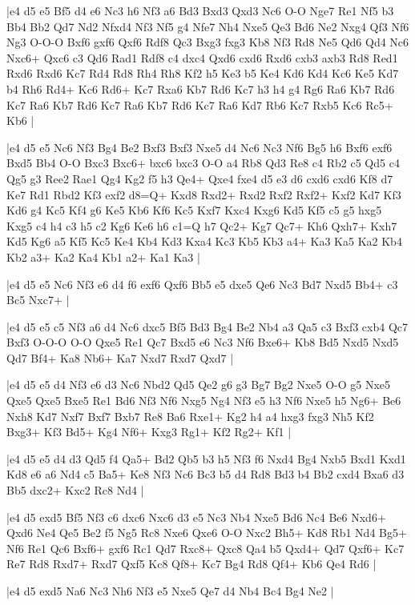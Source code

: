 \whitename{}
\blackname{}
\makegametitle
|e4 d5 e5 Bf5 d4 e6 Nc3 h6 Nf3 a6 Bd3 Bxd3 Qxd3 Nc6 O-O Nge7 Re1 Nf5 b3 Bb4 Bb2 Qd7 Nd2 Nfxd4 Nf3 Nf5 g4 Nfe7 Nh4 Nxe5 Qe3 Bd6 Ne2 Nxg4 Qf3 Nf6 Ng3 O-O-O Bxf6 gxf6 Qxf6 Rdf8 Qc3 Bxg3 fxg3 Kb8 Nf3 Rd8 Ne5 Qd6 Qd4 Nc6 Nxc6+ Qxc6 c3 Qd6 Rad1 Rdf8 c4 dxc4 Qxd6 cxd6 Rxd6 cxb3 axb3 Rd8 Red1 Rxd6 Rxd6 Kc7 Rd4 Rd8 Rh4 Rh8 Kf2 h5 Ke3 b5 Ke4 Kd6 Kd4 Kc6 Ke5 Kd7 b4 Rh6 Rd4+ Kc6 Rd6+ Kc7 Rxa6 Kb7 Rd6 Kc7 h3 h4 g4 Rg6 Ra6 Kb7 Rd6 Kc7 Ra6 Kb7 Rd6 Kc7 Ra6 Kb7 Rd6 Kc7 Ra6 Kd7 Rb6 Kc7 Rxb5 Kc6 Rc5+ Kb6  |

\whitename{}
\blackname{}
\makegametitle
|e4 d5 e5 Nc6 Nf3 Bg4 Be2 Bxf3 Bxf3 Nxe5 d4 Nc6 Nc3 Nf6 Bg5 h6 Bxf6 exf6 Bxd5 Bb4 O-O Bxc3 Bxc6+ bxc6 bxc3 O-O a4 Rb8 Qd3 Re8 c4 Rb2 c5 Qd5 c4 Qg5 g3 Ree2 Rae1 Qg4 Kg2 f5 h3 Qe4+ Qxe4 fxe4 d5 e3 d6 cxd6 cxd6 Kf8 d7 Ke7 Rd1 Rbd2 Kf3 exf2 d8=Q+ Kxd8 Rxd2+ Rxd2 Rxf2 Rxf2+ Kxf2 Kd7 Kf3 Kd6 g4 Kc5 Kf4 g6 Ke5 Kb6 Kf6 Kc5 Kxf7 Kxc4 Kxg6 Kd5 Kf5 c5 g5 hxg5 Kxg5 c4 h4 c3 h5 c2 Kg6 Ke6 h6 c1=Q h7 Qc2+ Kg7 Qc7+ Kh6 Qxh7+ Kxh7 Kd5 Kg6 a5 Kf5 Kc5 Ke4 Kb4 Kd3 Kxa4 Kc3 Kb5 Kb3 a4+ Ka3 Ka5 Ka2 Kb4 Kb2 a3+ Ka2 Ka4 Kb1 a2+ Ka1 Ka3  |

\whitename{}
\blackname{}
\makegametitle
|e4 d5 e5 Nc6 Nf3 e6 d4 f6 exf6 Qxf6 Bb5 e5 dxe5 Qe6 Nc3 Bd7 Nxd5 Bb4+ c3 Bc5 Nxc7+  |

\whitename{}
\blackname{}
\makegametitle
|e4 d5 e5 c5 Nf3 a6 d4 Nc6 dxc5 Bf5 Bd3 Bg4 Be2 Nb4 a3 Qa5 c3 Bxf3 cxb4 Qc7 Bxf3 O-O-O O-O Qxe5 Re1 Qc7 Bxd5 e6 Nc3 Nf6 Bxe6+ Kb8 Bd5 Nxd5 Nxd5 Qd7 Bf4+ Ka8 Nb6+ Ka7 Nxd7 Rxd7 Qxd7  |

\whitename{}
\blackname{}
\makegametitle
|e4 d5 e5 d4 Nf3 e6 d3 Nc6 Nbd2 Qd5 Qe2 g6 g3 Bg7 Bg2 Nxe5 O-O g5 Nxe5 Qxe5 Qxe5 Bxe5 Re1 Bd6 Nf3 Nf6 Nxg5 Ng4 Nf3 e5 h3 Nf6 Nxe5 h5 Ng6+ Be6 Nxh8 Kd7 Nxf7 Bxf7 Bxb7 Re8 Ba6 Rxe1+ Kg2 h4 a4 hxg3 fxg3 Nh5 Kf2 Bxg3+ Kf3 Bd5+ Kg4 Nf6+ Kxg3 Rg1+ Kf2 Rg2+ Kf1  |

\whitename{}
\blackname{}
\makegametitle
|e4 d5 e5 d4 d3 Qd5 f4 Qa5+ Bd2 Qb5 b3 h5 Nf3 f6 Nxd4 Bg4 Nxb5 Bxd1 Kxd1 Kd8 e6 a6 Nd4 c5 Ba5+ Ke8 Nf3 Nc6 Bc3 b5 d4 Rd8 Bd3 b4 Bb2 cxd4 Bxa6 d3 Bb5 dxc2+ Kxc2 Rc8 Nd4  |

\whitename{}
\blackname{}
\makegametitle
|e4 d5 exd5 Bf5 Nf3 c6 dxc6 Nxc6 d3 e5 Nc3 Nb4 Nxe5 Bd6 Nc4 Be6 Nxd6+ Qxd6 Ne4 Qe5 Be2 f5 Ng5 Rc8 Nxe6 Qxe6 O-O Nxc2 Bh5+ Kd8 Rb1 Nd4 Bg5+ Nf6 Re1 Qc6 Bxf6+ gxf6 Rc1 Qd7 Rxc8+ Qxc8 Qa4 b5 Qxd4+ Qd7 Qxf6+ Kc7 Re7 Rd8 Rxd7+ Rxd7 Qxf5 Kc8 Qf8+ Kc7 Bg4 Rd8 Qf4+ Kb6 Qe4 Rd6  |

\whitename{}
\blackname{}
\makegametitle
|e4 d5 exd5 Na6 Nc3 Nh6 Nf3 e5 Nxe5 Qe7 d4 Nb4 Bc4 Bg4 Ne2  |


